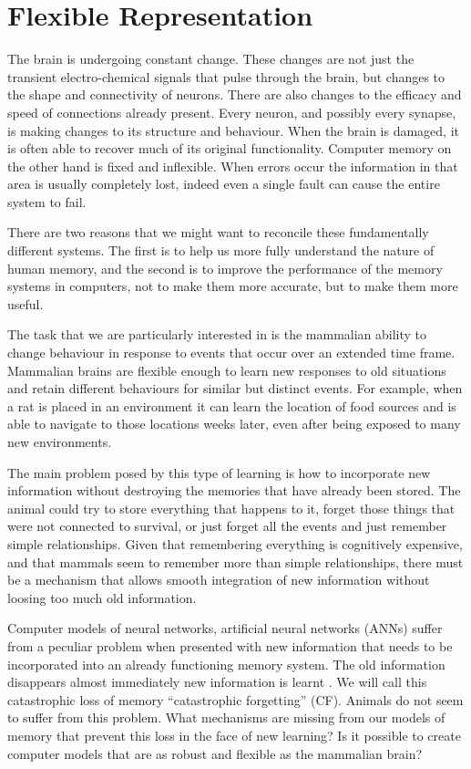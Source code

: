 \section{Flexible Representation}

The brain is undergoing constant change.  These changes are not just the transient electro-chemical signals that pulse through the brain, but changes to the shape and connectivity of neurons.  There are also changes to the efficacy and speed of connections already present.  Every neuron, and possibly every synapse, is making changes to its structure and behaviour.  When the brain is damaged, it is often able to recover much of its original functionality. Computer memory on the other hand is fixed and inflexible.  When errors occur the information in that area is usually completely lost, indeed even a single fault can cause the entire system to fail.

There are two reasons that we might want to reconcile these fundamentally different systems.  The first is to help us more fully understand the nature of human memory, and the second is to improve the performance of the memory systems in computers, not to make them more accurate, but to make them more useful.

The task that we are particularly interested in is the mammalian ability to change behaviour in response to events that occur over an extended time frame.  Mammalian brains are flexible enough to learn new responses to old situations and retain different behaviours for similar but distinct events.  For example, when a rat is placed in an environment it can learn the location of food sources and is able to navigate to those locations weeks later, even after being exposed to many new environments.

The main problem posed by this type of learning is how to incorporate new information without destroying the memories that have already been stored.  The animal could try to store everything that happens to it, forget those things that were not connected to survival, or just forget all the events and just remember simple relationships.  Given that remembering everything is cognitively expensive, and that mammals seem to remember more than simple relationships, there must be a mechanism that allows smooth integration of new information without loosing too much old information.  

Computer models of neural networks, artificial neural networks (ANNs) suffer from a peculiar problem when presented with new information that needs to be incorporated into an already functioning memory system.  The old information disappears almost immediately new information is learnt \citep{McCloskey1989}.  We will call this catastrophic loss of memory ``catastrophic forgetting'' (CF).  Animals do not seem to suffer from this problem.  What mechanisms are missing from our models of memory that prevent this loss in the face of new learning?  Is it possible to create computer models that are as robust and flexible as the mammalian brain?

